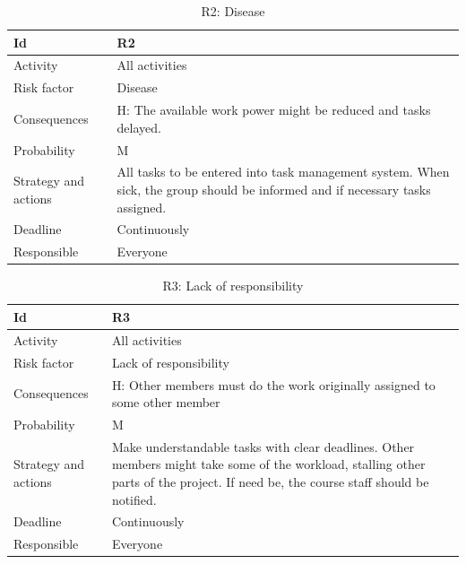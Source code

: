 \documentclass[11pt]{book}
\begin{document}
\begin{table}[H]
\centering
\begin{tabular}{ l  p{11cm} }
	Id						& R2 																		\\ \hline
	Activity				& All activities																	\\ \hline
	Risk factor				& Disease 																	\\ \hline
	Consequences			& H: The available work power might be reduced and tasks delayed. 			\\ \hline
	Probability				& M 																		\\ \hline
	Strategy and actions	& All tasks to be entered into task management system. 
							  When sick, the group should be informed and if necessary tasks assigned.	\\ \hline
	Deadline				& Continuously 																\\ \hline
	Responsible				& Everyone\\
\end{tabular}
\label{tab:risk_2}
\caption{R2: Disease}
\end{table}

\begin{table}[H]
\centering
\begin{tabular}{ l  p{11cm} }
	Id						& R3 																		\\ \hline
	Activity				& All activities																	\\ \hline
	Risk factor				& Lack of responsibility 													\\ \hline
	Consequences			& H: Other members must do the work originally assigned to some other member\\ \hline
	Probability				& M 																		\\ \hline
	Strategy and actions	& Make understandable tasks with clear deadlines. Other members might take 
								some of the workload, stalling other parts of the project. If need be, 
								the course staff should be notified. 									\\ \hline
	Deadline				& Continuously 																\\ \hline
	Responsible				& Everyone 																	\\ 
\end{tabular}
\label{tab:risk_3}
\caption{R3: Lack of responsibility}
\end{table}
\end{document}
